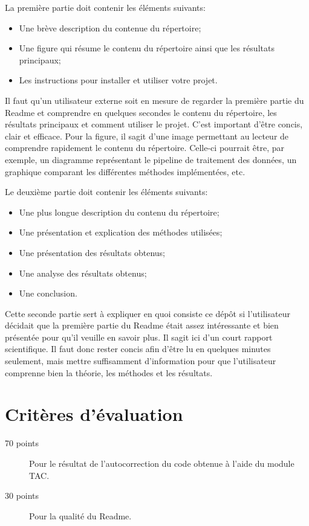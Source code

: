 \documentclass[12pt, letterpaper]{article}
\numberwithin{table}{section}
\numberwithin{figure}{section}
\numberwithin{equation}{section}
\begin{document}
\bigskip

\noindent La première partie doit contenir les éléments suivants:
\begin{itemize}
    \item Une brève description du contenue du répertoire;
    \item Une figure qui résume le contenu du répertoire ainsi que les résultats principaux;
    \item Les instructions pour installer et utiliser votre projet.
\end{itemize}
Il faut qu'un utilisateur externe soit en mesure de regarder la première partie du Readme et comprendre en quelques
secondes le contenu du répertoire, les résultats principaux et comment utiliser le projet.
C'est important d'être concis, clair et efficace.
Pour la figure, il sagit d'une image permettant au lecteur de comprendre rapidement le contenu du répertoire.
Celle-ci pourrait être, par exemple, un diagramme représentant le pipeline de traitement des données, un graphique
comparant les différentes méthodes implémentées, etc.

\bigskip

\noindent Le deuxième partie doit contenir les éléments suivants:
\begin{itemize}
    \item Une plus longue description du contenu du répertoire;
    \item Une présentation et explication des méthodes utilisées;
    \item Une présentation des résultats obtenus;
    \item Une analyse des résultats obtenus;
    \item Une conclusion.
\end{itemize}
Cette seconde partie sert à expliquer en quoi consiste ce dépôt si l'utilisateur décidait que la première partie
du Readme était assez intéressante et bien présentée pour qu'il veuille en savoir plus.
Il sagit ici d'un court rapport scientifique.
Il faut donc rester concis afin d'être lu en quelques minutes seulement, mais mettre suffisamment d'information pour
que l'utilisateur comprenne bien la théorie, les méthodes et les résultats.


\section{Critères d'évaluation}\label{sec:criteres-d'evaluation}

\begin{description}
  \item[70 points] Pour le résultat de l'autocorrection du code obtenue à l'aide du module TAC\@.
  \item[30 points] Pour la qualité du Readme.
\end{description}
\end{document}
